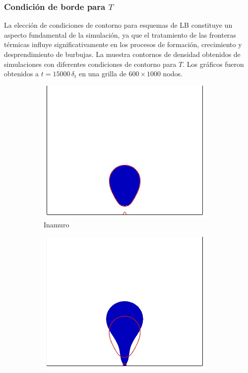 \subsubsection{Condici\'on de borde para $T$}

La elecci\'on de condiciones de contorno para esquemas de LB constituye un aspecto fundamental de la simulaci\'on, ya que el tratamiento de las fronteras t\'ermicas influye significativamente en los procesos de formaci\'on, crecimiento y desprendimiento de burbujas. La  muestra contornos de densidad obtenidos de simulaciones con diferentes condiciones de contorno para $T$. Los gr\'aficos fueron obtenidos a $t=15000\,\delta_t$ en una grilla de $600\times 1000$ nodos. 

\begin{figure}[htb]
    \centering
    \begin{subfigure}[t]{0.45\textwidth}
        \centering
        \includegraphics[width=0.95\textwidth]{Imagenes/HetBoiling/Borde/density_inamuro_fd}        
        \caption{Inamuro}
	    \label{fig:bubble2d_inamuro}        
    \end{subfigure}
    \begin{subfigure}[t]{0.45\textwidth}
        \centering
        \includegraphics[width=0.95\textwidth]{Imagenes/HetBoiling/Borde/density_extrapolation_fd}

\end{subfigure}
\end{figure}

